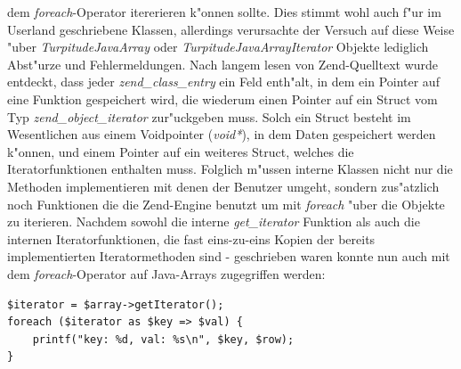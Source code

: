 dem \emph{foreach}-Operator itererieren k"onnen sollte. Dies stimmt wohl auch f"ur im Userland geschriebene Klassen, allerdings verursachte der Versuch auf diese Weise
"uber \emph{TurpitudeJavaArray} oder \emph{TurpitudeJavaArrayIterator} Objekte lediglich Abst"urze und Fehlermeldungen. Nach langem lesen von Zend-Quelltext
wurde entdeckt, dass jeder \emph{zend\_class\_entry} ein Feld enth"alt, in dem ein Pointer auf eine Funktion gespeichert wird, die wiederum einen Pointer auf ein Struct vom Typ
\emph{zend\_object\_iterator} zur"uckgeben muss. Solch ein Struct besteht im Wesentlichen aus einem Voidpointer (\emph{void*}), in dem Daten gespeichert werden k"onnen, und
einem Pointer auf ein weiteres Struct, welches die Iteratorfunktionen enthalten muss. Folglich m"ussen interne Klassen nicht nur die Methoden implementieren mit denen der
Benutzer umgeht, sondern zus"atzlich noch Funktionen die die Zend-Engine benutzt um mit \emph{foreach} "uber die Objekte zu iterieren. Nachdem sowohl die interne
\emph{get\_iterator} Funktion als auch die internen Iteratorfunktionen, die fast eins-zu-eins Kopien der bereits implementierten Iteratormethoden sind - geschrieben waren
konnte nun auch mit dem \emph{foreach}-Operator auf Java-Arrays zugegriffen werden:
\begin{lstlisting}[caption=Java-Array und foreach]
$iterator = $array->getIterator();
foreach ($iterator as $key => $val) {
    printf("key: %d, val: %s\n", $key, $row);
}
\end{lstlisting}

